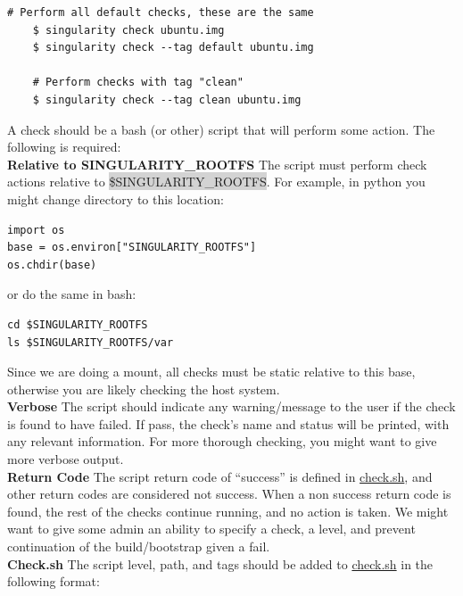\documentclass[a4paper]{article}
\newcounter{subsubsubsection}[subsubsection]
\begin{document}
\begin{lstlisting}[frame=single]
    # Perform all default checks, these are the same
    $ singularity check ubuntu.img
    $ singularity check --tag default ubuntu.img

    # Perform checks with tag "clean"
    $ singularity check --tag clean ubuntu.img

\end{lstlisting}



A check should be a bash (or other) script that will perform some action. The following is required:\\[0.1in]

\textbf{Relative to SINGULARITY\_ROOTFS} The script must perform check actions relative to \colorbox{lightgray}{\$SINGULARITY\_ROOTFS}. For example, in python you might change directory to this location:
\begin{lstlisting}[frame=single]
import os
base = os.environ["SINGULARITY_ROOTFS"]
os.chdir(base)
\end{lstlisting}


or do the same in bash:

\begin{lstlisting}[frame=single]
cd $SINGULARITY_ROOTFS
ls $SINGULARITY_ROOTFS/var
\end{lstlisting}

Since we are doing a mount, all checks must be static relative to this base, otherwise you are likely checking the host system.\\[0.1in]

\textbf{Verbose} The script should indicate any warning/message to the user if the check is found to have failed. If pass, the check’s name and status will be printed, with any relevant information. For more thorough checking, you might want to give more verbose output.\\[0.1in]

\textbf{Return Code} The script return code of “success” is defined in \href{http://singularity.lbl.gov/check.sh}{check.sh}, and other return codes are considered not success. When a non success return code is found, the rest of the checks continue running, and no action is taken. We might want to give some admin an ability to specify a check, a level, and prevent continuation of the build/bootstrap given a fail.\\[0.1in]

\textbf{Check.sh} The script level, path, and tags should be added to \href{http://singularity.lbl.gov/check.sh}{check.sh} in the following format:
\end{document}

